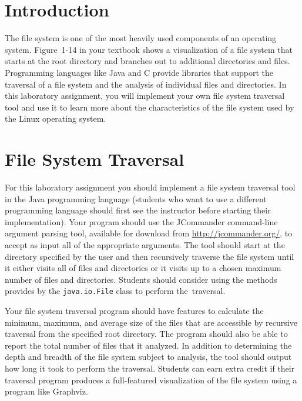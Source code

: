 

\usepackage[compact]{titlesec}



\section*{Introduction}

The file system is one of the most heavily used components of an operating system.  Figure~1-14 in your textbook shows a
visualization of a file system that starts at the root directory and branches out to additional directories and files.
Programming languages like Java and C provide libraries that support the traversal of a file system and the analysis of individual
files and directories. In this laboratory assignment, you will implement your own file system traversal tool and use it to learn
more about the characteristics of the file system used by the Linux operating system.

\section*{File System Traversal}

For this laboratory assignment you should implement a file system traversal tool in the Java programming language (students who
want to use a different programming language should first see the instructor before starting their implementation). Your program
should use the JCommander command-line argument parsing tool, available for download from \url{http://jcommander.org/}, to accept
as input all of the appropriate arguments. The tool should start at the directory specified by the user and then recursively
traverse the file system until it either visits all of files and directories or it visits up to a chosen maximum number of files
and directories. Students should consider using the methods provides by the {\tt java.io.File} class to perform \mbox{the
  traversal}.

Your file system traversal program should have features to calculate the minimum, maximum, and average size of the files that are
accessible by recursive traversal from the specified root directory. The program should also be able to report the total number of
files that it analyzed.  In addition to determining the depth and breadth of the file system subject to analysis, the tool should
output how long it took to perform the traversal. Students can earn extra credit if their traversal program produces a
full-featured visualization of the file system using a program like Graphviz.

